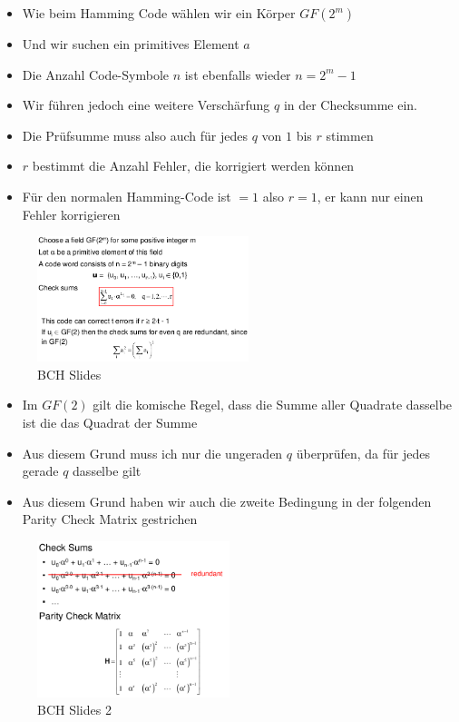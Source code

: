 \begin{itemize}
\tightlist
\item
  Wie beim Hamming Code wählen wir ein Körper $GF(2^m)$
\item
  Und wir suchen ein primitives Element $a$
\item
  Die Anzahl Code-Symbole $n$ ist ebenfalls wieder $n = 2^m -1$
\item
  Wir führen jedoch eine weitere Verschärfung $q$ in der Checksumme ein.
\item
  Die Prüfsumme muss also auch für jedes $q$ von $1$ bis $r$ stimmen
\item
  $r$ bestimmt die Anzahl Fehler, die korrigiert werden können
\item
  Für den normalen Hamming-Code ist $ = 1$ also $r = 1$, er kann nur einen
  Fehler korrigieren
\end{itemize}

\begin{figure}[H]
\centering
\includegraphics[width=0.55\textwidth]{figures/bch.png}
\caption{BCH Slides}
\end{figure}

\begin{itemize}
\tightlist
\item
  Im $GF(2)$ gilt die komische Regel, dass die Summe aller Quadrate
  dasselbe ist die das Quadrat der Summe
\item
  Aus diesem Grund muss ich nur die ungeraden $q$ überprüfen, da für jedes
  gerade $q$ dasselbe gilt
\item
  Aus diesem Grund haben wir auch die zweite Bedingung in der folgenden
  Parity Check Matrix gestrichen
\end{itemize}

\begin{figure}[H]
\centering
\includegraphics[width=0.5\textwidth]{figures/bch2.png}
\caption{BCH Slides 2}
\end{figure}

